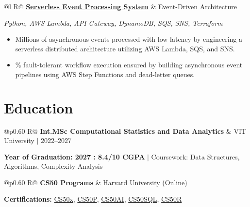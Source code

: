 \documentclass[a4paper,10pt]{article}
\newcommand{\ulink}[2]{\href{#1}{#2}}
\newcommand{\subheading}[1]{{\color[HTML]{0A0A0A}\fontsize{12}{14}\selectfont\bfseries #1}}
\newcommand{\techstack}[1]{{\color[HTML]{5C5C5C}\fontsize{10.5}{12.5}\selectfont\itshape #1}}
\newcommand{\meta}[1]{{\color[HTML]{5C5C5C}\fontsize{10.5}{12.5}\selectfont #1}}
\begin{document}
\begin{tabularx}{\linewidth}{@{}l R@{}}
\subheading{\ulink{https://github.com/su-jin1425/Serverless-Event-Processing-System}{Serverless Event Processing System}} & \meta{Event-Driven Architecture}
\end{tabularx}
\techstack{Python, AWS Lambda, API Gateway, DynamoDB, SQS, SNS, Terraform}
\begin{itemize}[nosep, leftmargin=1.5em, itemsep=2pt, topsep=2pt]
  \item {\color[HTML]{0A0A0A}\fontsize{11}{14}\selectfont Millions of asynchronous events processed with low latency by engineering a serverless distributed architecture utilizing AWS Lambda, SQS, and SNS.}
  \item {\color[HTML]{0A0A0A}\fontsize{11}{14}\% fault-tolerant workflow execution ensured by building asynchronous event pipelines using AWS Step Functions and dead-letter queues.}
\end{itemize}

\section{Education}
\vspace{2pt}

\begin{tabularx}{\linewidth}{@{}p{0.60\linewidth} R@{}}
\subheading{Int.MSc Computational Statistics and Data Analytics} & \meta{VIT University $|$ 2022--2027}
\end{tabularx}
{\color[HTML]{3A3A3A}\fontsize{11}{14}\selectfont \textbf{Year of Graduation: 2027 : 8.4/10 CGPA} $|$ Coursework: Data Structures, Algorithms, Complexity Analysis}

\begin{tabularx}{\linewidth}{@{}p{0.60\linewidth} R@{}}
\subheading{CS50 Programs} & \meta{Harvard University (Online)}
\end{tabularx}
{\color[HTML]{3A3A3A}\fontsize{11}{14}\selectfont \textbf{Certifications:} \ulink{https://cs50.harvard.edu/certificates/b14b78df-e05c-413e-a607-1dd27303053a}{CS50x}, \ulink{https://cs50.harvard.edu/certificates/32477052-9db4-49c4-a5a4-d7e58429ca2c}{CS50P}, \ulink{https://cs50.harvard.edu/certificates/9cdb4d4a-1250-4f8e-9fd7-191864e0f919}{CS50AI}, \ulink{https://cs50.harvard.edu/certificates/bc486f24-f085-4e61-8536-80940b97a1b9}{CS50SQL}, \ulink{https://cs50.harvard.edu/certificates/666838e6-a053-4d82-b179-a60fe745fd84}{CS50R}}

\end{document}
